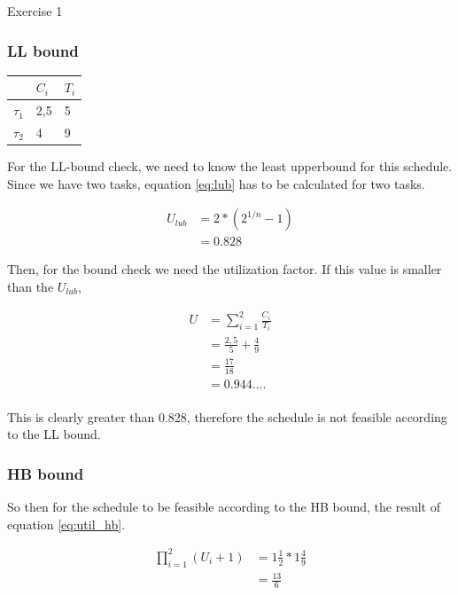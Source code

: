 \begin{homeworkProblem}
\label{sec:hapi}

\begin{homeworkSection}{Exercise 1}

\subsubsection{LL bound}
\begin{tabular}{l|l|l}
	& $C_i$ & $T_i$ \\
	\hline
	$\tau_1$ & 2,5 & 5 \\
	\hline
	$\tau_2$ & 4 & 9 \\
\end{tabular}


For the LL-bound check, we need to know the least upperbound for this schedule. Since we have two tasks, equation \ref{eq:lub} has to be calculated for two tasks.

\begin{equation} \label{eq:lub}
\begin{split}
U_{lub} &= 2*(2^{1/n}-1)\\
		&= 0.828
\end{split}
\end{equation}

Then, for the bound check we need the utilization factor. If this value is smaller than the $U_{lub}$, 

\begin{equation} \label{eq:util}
\begin{split}
U 	& = \sum_{i=1}^2 \frac{C_i}{T_i} \\
	& = \frac{2,5}{5} + \frac{4}{9}\\
	& = \frac{17}{18}\\
	& = 0.944....\\
\end{split}
\end{equation}

This is clearly greater than 0.828, therefore the schedule is not feasible according to the LL bound.

\subsubsection{HB bound}
So then for the schedule to be feasible according to the HB bound, the result of equation \ref{eq:util_hb}.

\begin{equation} \label{eq:util_hb}
\begin{split}
\prod_{i=1}^{2} (U_{i} + 1) & = 1\frac{1}{2} * 1\frac{4}{9} \\
		& = \frac{13}{6}	
\end{split} 	
\end{equation} 


\end{homeworkSection}
\end{homeworkProblem}
